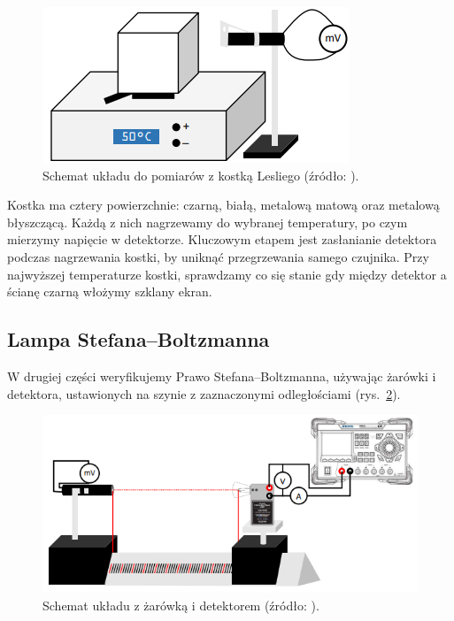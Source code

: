 \documentclass[12pt]{article}
\begin{document}
\begin{figure}[H]
	\centering
	\includegraphics[scale=0.5]{cube}
	\caption{Schemat układu do pomiarów z kostką Lesliego (źródło: \cite{skrypt}).}
	\label{fig:cube_diagram}
\end{figure}

Kostka ma cztery powierzchnie: czarną, białą, metalową matową oraz metalową błyszczącą. Każdą z nich nagrzewamy do wybranej temperatury, po czym mierzymy napięcie w detektorze. Kluczowym etapem jest zasłanianie detektora podczas nagrzewania kostki, by uniknąć przegrzewania samego czujnika.
Przy najwyższej temperaturze kostki, sprawdzamy co się stanie gdy między detektor a ścianę czarną włożymy szklany ekran.

\subsection{Lampa Stefana–Boltzmanna}
W drugiej części weryfikujemy Prawo Stefana–Boltzmanna, używając żarówki i detektora, ustawionych na szynie z zaznaczonymi odległościami (rys.~\ref{fig:lamp_diagram}). 

\begin{figure}[H]
	\centering
	\includegraphics[scale=0.5]{lamp}
	\caption{Schemat układu z żarówką i detektorem (źródło: \cite{skrypt}).}
	\label{fig:lamp_diagram}
\end{figure}
\end{document}
